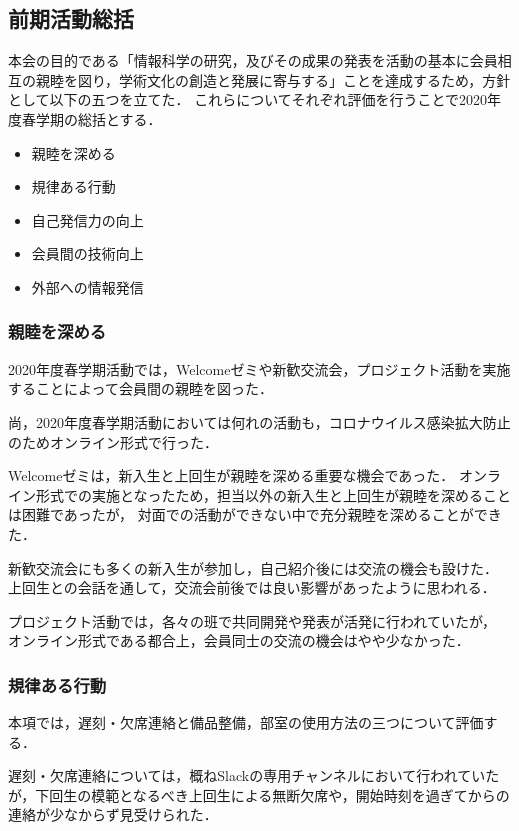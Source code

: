 \subsection*{前期活動総括}


本会の目的である「情報科学の研究，及びその成果の発表を活動の基本に会員相互の親睦を図り，学術文化の創造と発展に寄与する」ことを達成するため，方針として以下の五つを立てた．
これらについてそれぞれ評価を行うことで2020年度春学期の総括とする．

\begin{itemize}
    \item 親睦を深める
    \item 規律ある行動
    \item 自己発信力の向上
    \item 会員間の技術向上
    \item 外部への情報発信
\end{itemize}

\subsubsection*{親睦を深める}
    2020年度春学期活動では，Welcomeゼミや新歓交流会，プロジェクト活動を実施することによって会員間の親睦を図った．

    尚，2020年度春学期活動においては何れの活動も，コロナウイルス感染拡大防止のためオンライン形式で行った．

    Welcomeゼミは，新入生と上回生が親睦を深める重要な機会であった．
    オンライン形式での実施となったため，担当以外の新入生と上回生が親睦を深めることは困難であったが，
    対面での活動ができない中で充分親睦を深めることができた．

    新歓交流会にも多くの新入生が参加し，自己紹介後には交流の機会も設けた．
    上回生との会話を通して，交流会前後では良い影響があったように思われる．

    プロジェクト活動では，各々の班で共同開発や発表が活発に行われていたが，
    オンライン形式である都合上，会員同士の交流の機会はやや少なかった．

\subsubsection*{規律ある行動}
    本項では，遅刻・欠席連絡と備品整備，部室の使用方法の三つについて評価する．

    遅刻・欠席連絡については，概ねSlackの専用チャンネルにおいて行われていたが，下回生の模範となるべき上回生による無断欠席や，開始時刻を過ぎてからの連絡が少なからず見受けられた．

